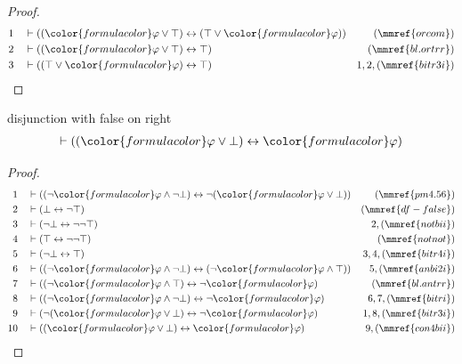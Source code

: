 \begin{proof}
\begin{align}
  1 && & \vdash ( ( {\color{formulacolor}\varphi} \vee \top ) \leftrightarrow (
      \top \vee {\color{formulacolor}\varphi} )
      )&(\mmref{orcom})\notag
  \\ 2 && & \vdash ( ( {\color{formulacolor}\varphi} \vee \top )
      \leftrightarrow \top )&(\mmref{bl.ortrr})\notag
  \\ 3 && & \vdash ( ( \top \vee {\color{formulacolor}\varphi} )
      \leftrightarrow \top )&1,2,(\mmref{bitr3i})\notag
\end{align}
\end{proof}

\begin{lemma} disjunction with false  on right
\begin{align}
\vdash ( ( {\color{formulacolor}\varphi} \vee \bot ) \leftrightarrow
    {\color{formulacolor}\varphi} )\label{bl.orfar}
\end{align}
\end{lemma}

\begin{proof}
\begin{align}
  1 && & \vdash ( ( \lnot {\color{formulacolor}\varphi} \wedge \lnot \bot )
      \leftrightarrow \lnot ( {\color{formulacolor}\varphi}
      \vee \bot ) )&(\mmref{pm4.56})\notag
  \\ 2 && & \vdash ( \bot \leftrightarrow \lnot \top
      )&(\mmref{df-false})\notag
  \\ 3 && & \vdash ( \lnot \bot \leftrightarrow \lnot \lnot \top
      )&2,(\mmref{notbii})\notag
  \\ 4 && & \vdash ( \top \leftrightarrow \lnot \lnot \top
      )&(\mmref{notnot})\notag
  \\ 5 && & \vdash ( \lnot \bot \leftrightarrow \top
      )&3,4,(\mmref{bitr4i})\notag
  \\ 6 && & \vdash ( ( \lnot {\color{formulacolor}\varphi} \wedge \lnot \bot )
      \leftrightarrow ( \lnot {\color{formulacolor}\varphi}
      \wedge \top ) )&5,(\mmref{anbi2i})\notag
  \\ 7 && & \vdash ( ( \lnot {\color{formulacolor}\varphi} \wedge \top )
      \leftrightarrow \lnot {\color{formulacolor}\varphi}
      )&(\mmref{bl.antrr})\notag
  \\ 8 && & \vdash ( ( \lnot {\color{formulacolor}\varphi} \wedge \lnot \bot )
      \leftrightarrow \lnot {\color{formulacolor}\varphi}
      )&6,7,(\mmref{bitri})\notag
  \\ 9 && & \vdash ( \lnot ( {\color{formulacolor}\varphi} \vee \bot )
      \leftrightarrow \lnot {\color{formulacolor}\varphi}
      )&1,8,(\mmref{bitr3i})\notag
  \\ 10 && & \vdash ( ( {\color{formulacolor}\varphi} \vee \bot )
      \leftrightarrow {\color{formulacolor}\varphi}
      )&9,(\mmref{con4bii})\notag
\end{align}
\end{proof}

